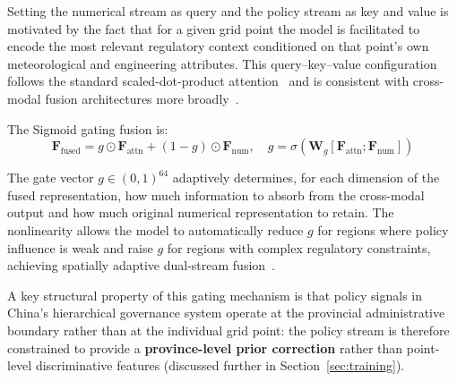 \documentclass[12pt, a4paper]{article}
\begin{document}
Setting the numerical stream as query and the policy stream
as key and value is motivated by the fact that for a given
grid point the model is facilitated to encode the most relevant
regulatory context conditioned on that point's own
meteorological and engineering attributes. This
query--key--value configuration follows the standard
scaled-dot-product attention~\cite{vaswani2017} and is
consistent with cross-modal fusion architectures more
broadly~\cite{baltrusaitis2019}.

The Sigmoid gating fusion is:
\begin{equation}
\mathbf{F}_\text{fused} =
  g \odot \mathbf{F}_\text{attn} +
  (1-g) \odot \mathbf{F}_\text{num},
\quad
g=\sigma\!\left(\mathbf{W}_g[\mathbf{F}_\text{attn};
\mathbf{F}_\text{num}]\right)
\label{eq:gating}
\end{equation}

The gate vector $g \in (0,1)^{64}$ adaptively determines, for
each dimension of the fused representation, how much
information to absorb from the cross-modal output and how much
original numerical representation to retain. The nonlinearity
allows the model to automatically reduce $g$ for regions where
policy influence is weak and raise $g$ for regions with complex
regulatory constraints, achieving spatially adaptive dual-stream
fusion~\cite{qiu2025gated}.

A key structural property of this gating mechanism is that
policy signals in China's hierarchical governance system
operate at the provincial administrative boundary rather than
at the individual grid point: the policy stream is therefore
constrained to provide a \textbf{province-level prior
correction} rather than point-level discriminative features
(discussed further in Section~\ref{sec:training}).
\end{document}
